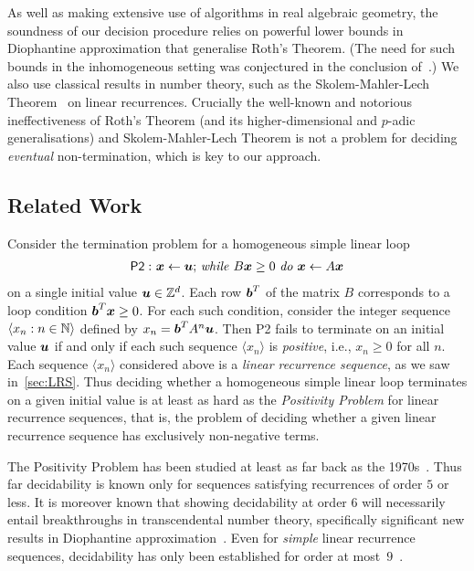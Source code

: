 As well as making extensive use of algorithms in real algebraic
geometry, the soundness of our decision procedure relies on powerful
lower bounds in Diophantine approximation that generalise Roth's
Theorem.  (The need for such bounds in the inhomogeneous setting was
conjectured in the conclusion of~\cite{Bra06}.)  We
also use classical results in number theory, such as the
Skolem-Mahler-Lech Theorem~\cite{Lec53,Mah35,Sko34} on linear
recurrences.  Crucially the well-known and notorious ineffectiveness
of Roth's Theorem (and its higher-dimensional and $p$-adic
generalisations) and Skolem-Mahler-Lech Theorem is not a
problem for deciding \emph{eventual} non-termination, which is key to
our approach.

\subsection{Related Work}

Consider the termination problem for a homogeneous simple linear loop
\begin{gather*}
\mathsf{P2:}\  \mbox{$\boldsymbol{x}\gets \boldsymbol{u}$;
\textit{while} $B\boldsymbol{x} \geq 0$ \textit{do} $\boldsymbol{x}\leftarrow A\boldsymbol{x}$}
\end{gather*}
on a single initial value $\boldsymbol{u}\in \mathbb{Z}^{d}$.  Each row
$\boldsymbol{b}^T$ of the matrix $B$ corresponds to a loop condition
$\boldsymbol{b}^T\boldsymbol{x} \geq 0$.  For each such condition,
consider the integer sequence $\langle x_n : n \in \mathbb{N} \rangle$
defined by $x_n = \boldsymbol{b}^{T} A^{n} \boldsymbol{u}$.  Then
\textsf{P2} fails to terminate on an initial value $\boldsymbol{u}$ if
and only if each such sequence $\langle x_n \rangle$ is
\emph{positive}, i.e., $x_n \geq 0$ for all $n$. 
Each sequence $\langle x_n \rangle$ considered above is a
\emph{linear recurrence sequence}, as we saw in~\cref{sec:LRS}.
Thus deciding whether a homogeneous simple linear loop
terminates on a given initial value is at least as hard as the
\emph{Positivity Problem} for linear recurrence sequences, that is,
the problem of deciding whether a given linear recurrence sequence has
exclusively non-negative terms.

The Positivity Problem has been studied at least as far back as the
1970s~\cite{BG07,HHH06,Liu10,RS94,Sal76}.  Thus far decidability is
known only for sequences satisfying recurrences of order $5$ or less.
It is moreover known that showing decidability at order $6$ will
necessarily entail breakthroughs in transcendental number theory,
specifically significant new results in Diophantine
approximation~\cite{OW14:SODA}. Even for \emph{simple} linear recurrence
sequences, decidability has only been established for order at
most~$9$~\cite{OW13:constructive-positivity}.

